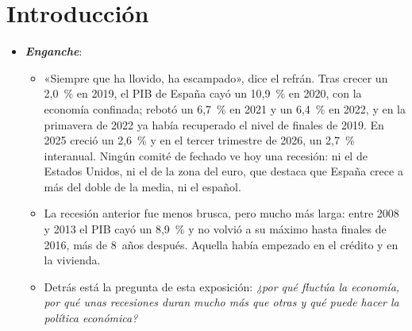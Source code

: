 \documentclass[11pt]{article}
\begin{document}
\tceetitulo

\section*{Introducción}

\begin{itemize}
\item \textbf{\emph{Enganche}}:
  \begin{itemize}
  \item «Siempre que ha llovido, ha escampado», dice el refrán. Tras crecer un 2,0~\% en 2019, el PIB de España cayó un 10,9~\% en 2020, con la economía confinada; rebotó un 6,7~\% en 2021 y un 6,4~\% en 2022, y en la primavera de 2022 ya había recuperado el nivel de finales de 2019. En 2025 creció un 2,6~\% y en el tercer trimestre de 2026, un 2,7~\% interanual\nocite{INE2026CNTRVolumen,INE2026avCNTR3T26}. Ningún comité de fechado ve hoy una recesión: ni el de Estados Unidos, ni el de la zona del euro, que destaca que España crece a más del doble de la media, ni el español\nocite{NBER2026Ciclos,EABCDC2026Primavera,AEE2026Fechado}.
  \item La recesión anterior fue menos brusca, pero mucho más larga: entre 2008 y 2013 el PIB cayó un 8,9~\% y no volvió a su máximo hasta finales de 2016, más de 8~años después\nocite{INE2026CNTRVolumen}. Aquella había empezado en el crédito y en la vivienda.
  \item Detrás está la pregunta de esta exposición: \emph{¿por qué fluctúa la economía, por qué unas recesiones duran mucho más que otras y qué puede hacer la política económica?}
  \end{itemize}


\end{itemize}
\end{document}
